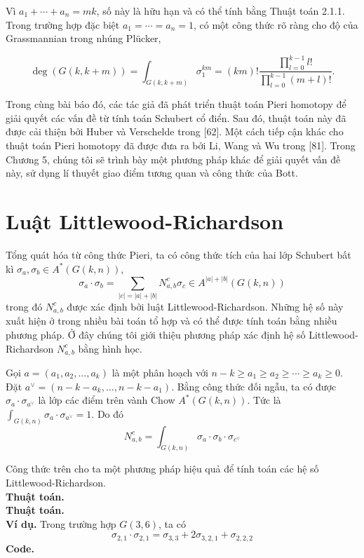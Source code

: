 \documentclass[11pt,a4paper]{book}
\begin{document}
Vì \( a_1+\cdots+a_n=m k \), số này là hữu hạn và có thể tính bằng Thuật toán 2.1.1. Trong trường hợp đặc biệt \( a_1=\cdots=a_n=1 \), có một công thức rõ ràng cho độ của Grassmannian trong nhúng Plücker,

\[
\operatorname{deg}(G(k, k+m))=\int_{G(k, k+m)} \sigma_1^{k m}=(k m) ! \frac{\prod_{l=0}^{k-1} l !}{\prod_{l=0}^{k-1}(m+l) !} .
\]

Trong cùng bài báo đó, các tác giả đã phát triển thuật toán Pieri homotopy để giải quyết các vấn đề từ tính toán Schubert cổ điển. Sau đó, thuật toán này đã được cải thiện bởi Huber và Verschelde trong [62]. Một cách tiếp cận khác cho thuật toán Pieri homotopy đã được đưa ra bởi Li, Wang và Wu trong [81]. Trong Chương 5, chúng tôi sẽ trình bày một phương pháp khác để giải quyết vấn đề này, sử dụng lí thuyết giao điểm tương quan và công thức của Bott.


\section{Luật Littlewood-Richardson}

Tổng quát hóa từ công thức Pieri, ta có công thức tích của hai lớp Schubert bất kì $\sigma_a, \sigma_b \in A^*(G(k, n))$,
$$\sigma_a \cdot \sigma_b=\sum_{|c|=|a|+|b|} N_{a, b}^c \sigma_c \in A^{|a|+|b|}(G(k, n))$$
trong đó $N_{a, b}^c$ được xác định bởi luật Littlewood-Richardson. Những hệ số này xuất hiện ở trong nhiều bài toán tổ hợp và có thể được tính toán bằng nhiều phương pháp. Ở đây chúng tôi giới thiệu phương pháp xác định hệ số Littlewood-Richardson $N_{a, b}^c$ bằng hình học.

Gọi $a=\left(a_1, a_2, \ldots, a_k\right)$ là một phân hoạch với $n-k \geq a_1 \geq a_2 \geq \cdots \geq a_k \geq 0$. Đặt $a^{\vee}=\left(n-k-a_k, \ldots, n-k-a_1\right)$. Bằng công thức đối ngẫu, ta có được $\sigma_a \cdot \sigma_{a^\vee}$ là lớp các điểm trên vành Chow $A^*(G(k, n))$. Tức là $\int_{G(k, n)} \sigma_a \cdot \sigma_{a^{\vee}}=1$. Do đó
$$N_{a, b}^c=\int_{G(k, n)} \sigma_a \cdot \sigma_b \cdot \sigma_{c^{\vee}}$$

Công thức trên cho ta một phương pháp hiệu quả để tính toán các hệ số Littlewood-Richardson.\\
\textbf{Thuật toán.}\\
\textbf{Thuật toán.}\\
\textbf{Ví dụ.} Trong trường hợp $G(3,6)$, ta có
$$\sigma_{2,1}\cdot\sigma_{2,1}=\sigma_{3,3}+2\sigma_{3,2,1}+\sigma_{2,2,2}$$
\textbf{Code.}
\end{document}
